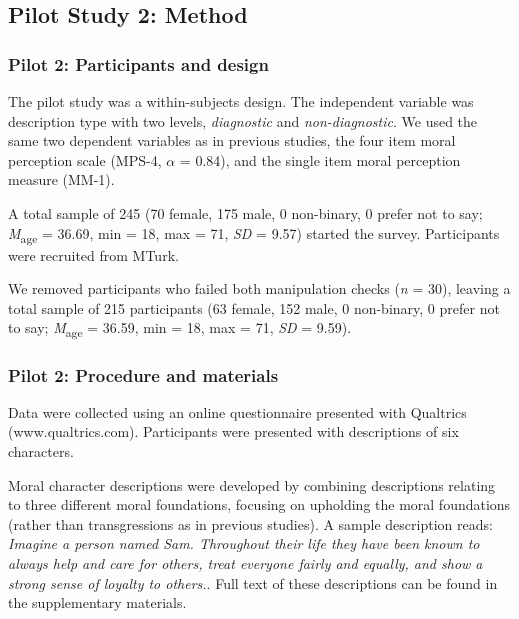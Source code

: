 \documentclass[
  american,
  man,floatsintext]{apa7}
\begin{document}
\hypertarget{pilot-study-2-method}{%
\subsection{Pilot Study 2: Method}\label{pilot-study-2-method}}

\hypertarget{pilot-2-participants-and-design}{%
\subsubsection{Pilot 2: Participants and design}\label{pilot-2-participants-and-design}}

The pilot study was a within-subjects design. The independent variable was description type with two levels, \emph{diagnostic} and \emph{non-diagnostic}. We used the same two dependent variables as in previous studies, the four item moral perception scale (MPS-4, \(\alpha\) = 0.84), and the single item moral perception measure (MM-1).

A total sample of 245 (70 female, 175 male, 0 non-binary, 0 prefer not to say; \emph{M}\textsubscript{age} = 36.69, min = 18, max = 71, \emph{SD} = 9.57) started the survey. Participants were recruited from MTurk.

We removed participants who failed both manipulation checks (\emph{n} = 30), leaving a total sample of 215 participants (63 female, 152 male, 0 non-binary, 0 prefer not to say; \emph{M}\textsubscript{age} = 36.59, min = 18, max = 71, \emph{SD} = 9.59).

\hypertarget{pilot-2-procedure-and-materials}{%
\subsubsection{Pilot 2: Procedure and materials}\label{pilot-2-procedure-and-materials}}

Data were collected using an online questionnaire presented with Qualtrics (www.qualtrics.com). Participants were presented with descriptions of six characters.

Moral character descriptions were developed by combining descriptions relating to three different moral foundations, focusing on upholding the moral foundations (rather than transgressions as in previous studies). A sample description reads: \emph{Imagine a person named Sam. Throughout their life they have been known to always help and care for others, treat everyone fairly and equally, and show a strong sense of loyalty to others.}. Full text of these descriptions can be found in the supplementary materials.
\end{document}
